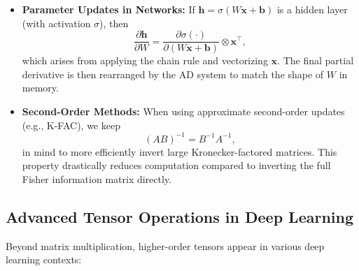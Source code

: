 \begin{itemize}
    \item \textbf{Parameter Updates in Networks:} 
          If $\mathbf{h} = \sigma(W \mathbf{x} + \mathbf{b})$ is a hidden layer (with activation $\sigma$), 
          then
          \[
            \frac{\partial \mathbf{h}}{\partial W} 
            = \frac{\partial \sigma(\cdot)}{\partial (W \mathbf{x} + \mathbf{b})}
              \otimes \mathbf{x}^\top,
          \]
          which arises from applying the chain rule and vectorizing $\mathbf{x}$. 
          The final partial derivative is then rearranged by the AD system to match the shape 
          of $W$ in memory.

    \item \textbf{Second-Order Methods:} 
          When using approximate second-order updates (e.g., K-FAC), we keep 
          \[
            (AB)^{-1} = B^{-1} A^{-1},
          \]
          in mind to more efficiently invert large Kronecker-factored matrices. 
          This property drastically reduces computation compared to inverting the 
          full Fisher information matrix directly.
\end{itemize}

\subsection{Advanced Tensor Operations in Deep Learning}
Beyond matrix multiplication, higher-order tensors appear in various deep learning contexts:

